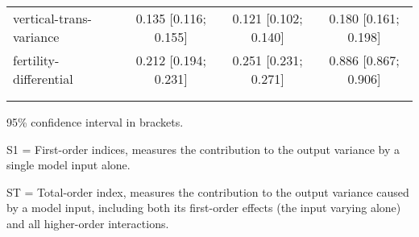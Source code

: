 \begin{table}[htp]
\begin{threeparttable}
\begin{tabular}{lccc}
	  \hspace{1.5em} vertical-trans-variance & 0.135 [0.116; 0.155]   & 0.121 [0.102; 0.140]   & 0.180 [0.161; 0.198] \\
	  \hspace{1.5em} fertility-differential & 0.212 [0.194; 0.231]   & 0.251 [0.231; 0.271]   & 0.886 [0.867; 0.906] \\
	 \\
\addlinespace
\hline
\end{tabular}
\begin{tablenotes}
\scriptsize
\item 95\% confidence interval in brackets.
\item S1 = First-order indices,  measures the contribution to the output variance by a single model input alone.
\item ST = Total-order index, measures the contribution to the output variance caused by a model input, including both its first-order effects (the input varying alone) and all higher-order interactions.
\end{tablenotes}
\end{threeparttable}
\end{table}